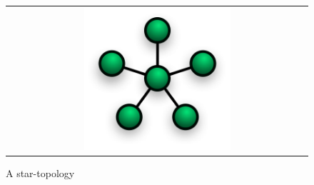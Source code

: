 \begin{figure}
\centering
\begin{tabular}{@{}c@{}}
\includegraphics[width=0.5\textwidth]{NetworkTopology-Star.png}
\end{tabular}
\caption{\label{fig:star} A star-topology}
\end{figure}



